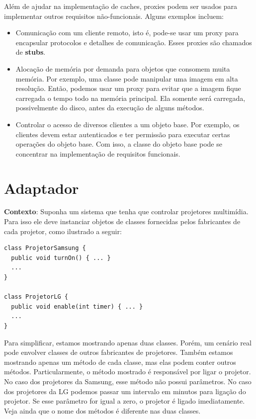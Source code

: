 \documentclass[
  11pt,
  twoside]{book}
\begin{document}
Além de ajudar na implementação de caches, proxies podem ser usados para
implementar outros requisitos não-funcionais. Alguns exemplos incluem:

\begin{itemize}
\item
  Comunicação com um cliente remoto, isto é, pode-se usar um proxy para
  encapsular protocolos e detalhes de comunicação. Esses proxies
   são chamados de \textbf{stubs}.
\item
  Alocação de memória por demanda para objetos que consomem muita
  memória. Por exemplo, uma classe pode manipular uma imagem em alta
  resolução. Então, podemos usar um proxy para evitar que a imagem fique
  carregada o tempo todo na memória principal. Ela somente será
  carregada, possivelmente do disco, antes da execução de alguns
  métodos.
\item
  Controlar o acesso de diversos clientes a um objeto base. Por exemplo,
  os clientes devem estar autenticados e ter permissão para executar
  certas operações do objeto base. Com isso, a classe do objeto base
  pode se concentrar na implementação de requisitos funcionais.
\end{itemize}

\hypertarget{adaptador}{%
\section{Adaptador}\label{adaptador}}

 

\textbf{Contexto}: Suponha um sistema que tenha que controlar projetores
multimídia. Para isso ele deve instanciar objetos de classes fornecidas
pelos fabricantes de cada projetor, como ilustrado a seguir:

\begin{lstlisting}
class ProjetorSamsung {
  public void turnOn() { ... }
  ...
}

class ProjetorLG {
  public void enable(int timer) { ... }
  ...
}
\end{lstlisting}

Para simplificar, estamos mostrando apenas duas classes. Porém, um
cenário real pode envolver classes de outros fabricantes de projetores.
Também estamos mostrando apenas um método de cada classe, mas elas podem
conter outros métodos. Particularmente, o método mostrado é responsável
por ligar o projetor. No caso dos projetores da Samsung, esse método não
possui parâmetros. No caso dos projetores da LG podemos passar um
intervalo em minutos para ligação do projetor. Se esse parâmetro for
igual a zero, o projetor é ligado imediatamente. Veja ainda que o nome
dos métodos é diferente nas duas classes.
\end{document}
